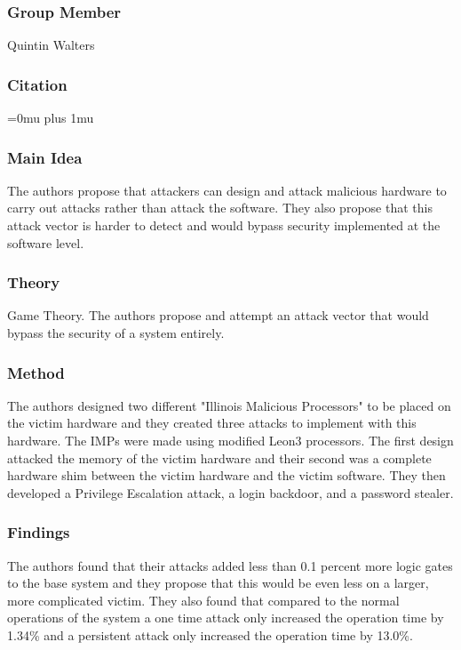 \subsubsection{Group Member}

\noindent
Quintin Walters

\noindent
\subsubsection{Citation}

\Urlmuskip=0mu plus 1mu\relax

\subsubsection{Main Idea}

\noindent
The authors propose that attackers can design and attack malicious hardware to carry out attacks rather than attack the software.  They also propose that this attack vector is harder to detect and would bypass security implemented at the software level.

\subsubsection{Theory}

\noindent
Game Theory.  The authors propose and attempt an attack vector that would bypass the security of a system entirely.

\subsubsection{Method}

\noindent
The authors designed two different "Illinois Malicious Processors" to be placed on the victim hardware and they created three attacks to implement with this hardware.  The IMPs were made using modified Leon3 processors.  The first design attacked the memory of the victim hardware and their second was a complete hardware shim between the victim hardware and the victim software. They then developed a Privilege Escalation attack, a login backdoor, and a password stealer.

\subsubsection{Findings}

\noindent
The authors found that their attacks added less than 0.1 percent more logic gates to the base system and they propose that this would be even less on a larger, more complicated victim.  They also found that compared to the normal operations of the system a one time attack only increased the operation time by 1.34\% and a persistent attack only increased the operation time by 13.0\%.  

